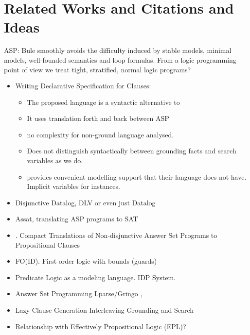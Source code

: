\documentclass[conference]{IEEEtran}
\begin{document}
\section{Related Works and Citations and Ideas}

ASP: Bule smoothly avoids the difficulty induced by stable models, minimal models, well-founded 
semantics and loop formulas. From a logic programming point of view we treat tight, stratified, normal logic programs?

\begin{itemize}
    \item Writing Declarative Specification for Clauses: \cite{Gebser16} 
        \begin{itemize}
            \item The proposed language is a syntactic alternative to \bcore
            \item It uses translation forth and back between ASP
            \item no complexity for non-ground language analysed. 
            \item Does not distinguish syntactically between grounding facts and search variables as we do. 
            \item \bnice provides convenient modelling support that their language does not have. Implicit variables for instances. 
        \end{itemize}
    \item Disjunctive Datalog, DLV \cite{Eiter97} or even just Datalog \cite{Gottlob89}
    \item Assat, translating ASP programs to SAT \cite{Lin04}
    \item \cite{Janhunen11}. Compact Translations of Non-disjunctive Answer Set
        Programs to Propositional Clauses
    \item FO(ID). First order logic with bounds (guards) \cite{Wittocx10}
    \item Predicate Logic as a modeling language. IDP System. \cite{Cat18}
    \item Answer Set Programming Lparse/Gringo \cite{Gebser15}, \cite{Ferraris05}
    \item Lazy Clause Generation Interleaving Grounding and Search \cite{Cat15}
    \item Relationship with Effectively Propositional Logic (EPL)? 
\end{itemize}



\end{document}

